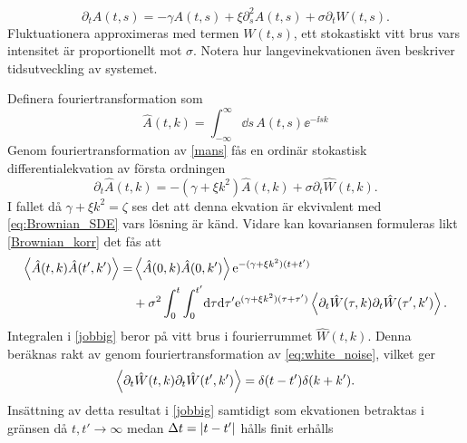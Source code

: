 \begin{equation}
\label{mans}
    \partial_{t}A(t,s)=-\gamma A(t,s)+\xi \partial_{s}^{2}A(t,s)+\sigma \partial_{t}W(t,s).
\end{equation}
Fluktuationera approximeras med termen $W(t,s)$, ett stokastiskt vitt brus vars intensitet är proportionellt mot  $\sigma$. Notera hur langevinekvationen även beskriver tidsutveckling av systemet.


Definera fouriertransformation som 
\begin{equation}
    \hat{A}(t,k)=\int_{-\infty}^{\infty}\!\dd{s}\, A(t,s)\ee^{-\ii sk}
\end{equation}
Genom fouriertransformation av \eqref{mans} fås en ordinär stokastisk differentialekvation av första ordningen
\begin{equation}
        \partial_{t}\hat{A}(t,k)=-\left(\gamma+\xi k^2\right)\hat{A}(t,k)+\sigma \partial_{t}\hat{W}(t,k).
\end{equation}
I fallet då $\gamma+\xi k^2=\zeta$ ses det att denna ekvation är ekvivalent med \eqref{eq:Brownian_SDE} vars lösning är känd. Vidare kan kovariansen formuleras likt \eqref{Brownian_korr} det fås att
\begin{equation}\label{jobbig}
\begin{aligned}
    \ev{\hat{A}(t,k)\hat{A}(t',k')} =& \ev{\hat{A}(0,k)\hat{A}(0,k')} \ee^{-(\gamma+\xi k^2)(t+t')}\\ 
    &+ \sigma^2 \int_{0}^{t}\int_{0}^{t'}\!\dd\tau\dd\tau' \ee^{(\gamma+\xi k^2)(\tau+\tau')} \ev{\partial_{t}\hat{W}(\tau,k)\partial_{t}\hat{W}(\tau',k')}.
\end{aligned}
\end{equation}
Integralen i \eqref{jobbig} beror på vitt brus i fourierrummet $\hat{W}(t,k)$. Denna beräknas rakt av genom fouriertransformation av \eqref{eq:white_noise}, vilket ger
\begin{equation}
    \ev{\partial_{t}\hat{W}(t,k)\partial_{t}\hat{W}(t',k')}=\delta(t-t')\delta(k+k').
\end{equation}
Insättning av detta resultat i \eqref{jobbig} samtidigt som ekvationen betraktas i gränsen då $t,t'\rightarrow\infty$ medan $\Delta t=\abs{t-t'}$ hålls finit erhålls

